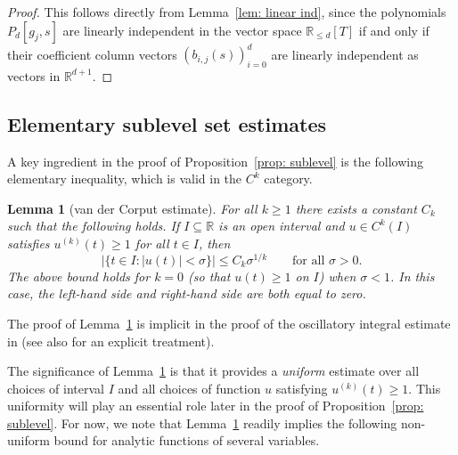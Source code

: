 \documentclass[reqno]{amsart}
\numberwithin{equation}{section}
\newcommand{\R}{\mathbb{R}}
\theoremstyle{plain}
\newtheorem{lemma}[theorem]{Lemma}
\theoremstyle{definition}
\begin{document}
\begin{proof} This follows directly from Lemma~\ref{lem: linear ind}, since the polynomials $P_d[g_j,s]$ are linearly independent in the vector space $\R_{\le d}[T]$ if and only if their coefficient column vectors $(b_{i,j}(s))_{i=0}^d$ are linearly independent as vectors in $\R^{d+1}$.
\end{proof}






\subsection{Elementary sublevel set estimates} A key ingredient in the proof of Proposition~\ref{prop: sublevel} is the following elementary inequality, which is valid in the $C^k$ category. 

\begin{lemma}[van der Corput estimate]\label{lem: van der Corput} For all $k \geq 1$ there exists a constant $C_k$ such that the following holds. If $I \subseteq \R$ is an open interval and $u \in C^k(I)$ satisfies $u^{(k)}(t) \geq 1$ for all $t \in I$, then
\begin{equation*}
    |\{t \in I : |u(t)| < \sigma \}| \leq C_k \sigma^{1/k} \qquad \textrm{for all $\sigma > 0$.}
\end{equation*}
The above bound holds for $k=0$ (so that $u(t) \geq 1$ on $I$) when $\sigma<1$. In this case, the left-hand side and right-hand side are both equal to zero.
\end{lemma}

The proof of Lemma~\ref{lem: van der Corput} is implicit in the proof of the oscillatory integral estimate in \cite[Proposition 2, p. 332]{Stein1993} (see also \cite[Lemma 3.3]{Christ1985} for an explicit treatment). 

The significance of Lemma~\ref{lem: van der Corput} is that it provides a \textit{uniform} estimate over all choices of interval $I$ and all choices of function $u$ satisfying $u^{(k)}(t) \geq 1$. This uniformity will play an essential role later in the proof of Proposition~\ref{prop: sublevel}. For now, we note that Lemma~\ref{lem: van der Corput} readily implies the following non-uniform bound for analytic functions of several variables.  
\end{document}
